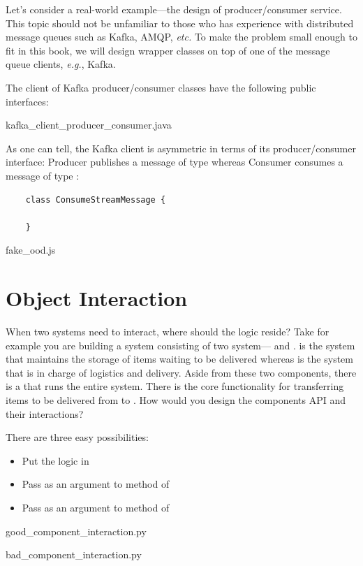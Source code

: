 Let's consider a real-world example---the design of producer/consumer service.
This topic should not be unfamiliar to those who has experience with distributed message queues
such as Kafka, AMQP, \textit{etc.}
To make the problem small enough to fit in this book, we will design wrapper classes on top of
one of the message queue clients, \textit{e.g.}, Kafka.


The \java client of Kafka producer/consumer classes have the following public interfaces:


{kafka_client_producer_consumer.java}

As one can tell, the Kafka client is asymmetric in terms of its producer/consumer interface:
Producer publishes a message of type  whereas Consumer consumes a message of type
:
\begin{lstlisting}
    class ConsumeStreamMessage {

    }
\end{lstlisting}


{fake_ood.js}

\section{Object Interaction}\label{sec:object-interaction}

When two systems need to interact, where should the logic reside?
Take for example you are building a system consisting of two system--- and
.
 is the system that maintains the storage of items waiting to be delivered whereas
 is the system that is in charge of logistics and delivery.
Aside from these two components, there is a  that runs the entire system.
There is the core functionality for transferring items to be delivered from  to
.
How would you design the components API and their interactions?

There are three easy possibilities:
\begin{itemize}
    \item Put the logic in 
    \item Pass  as an argument to method of 
    \item Pass  as an argument to method of 
\end{itemize}


{good_component_interaction.py}


{bad_component_interaction.py}

